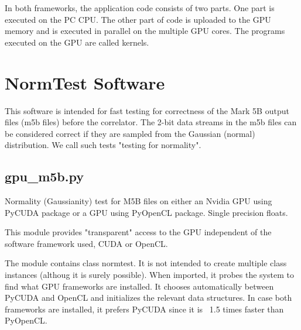\documentclass[letterpaper,twoside,12pt]{article}
\begin{document}
In both frameworks, the application code consists of two parts. One part is executed on the PC CPU. The other part of code is uploaded to the GPU memory and is executed in parallel on the multiple GPU cores. The programs executed on the GPU are called kernels.


\section{NormTest Software}

This software is intended for fast testing for correctness of the Mark 5B output
files (m5b files) before the correlator. The 2-bit data streams in the m5b files
can be considered correct if they are sampled from the Gaussian (normal)
distribution. We call such tests "testing for normality".

\subsection{gpu\_m5b.py}

Normality (Gaussianity) test for M5B files on either an Nvidia GPU using PyCUDA
package or a GPU using PyOpenCL package. Single precision floats.

This module provides "transparent" access to the GPU independent of the
software framework used, CUDA or OpenCL.

The module contains class normtest. It is not intended to create multiple
class instances (althoug it is surely possible). When imported, it 
probes the system to find what GPU frameworks are installed. It chooses
automatically between PyCUDA and OpenCL and initializes the relevant 
data structures. In case both frameworks are installed, it prefers
PyCUDA since it is ~1.5 times faster than PyOpenCL. \\
\end{document}
